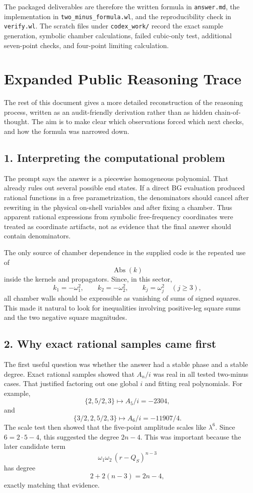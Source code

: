 \documentclass[11pt]{article}
\begin{document}
The packaged deliverables are therefore the written formula in
\texttt{answer.md}, the implementation in \texttt{two\_minus\_formula.wl}, and
the reproducibility check in \texttt{verify.wl}. The scratch files under
\texttt{codex\_work/} record the exact sample generation, symbolic chamber
calculations, failed cubic-only test, additional seven-point checks, and
four-point limiting calculation.

\section*{Expanded Public Reasoning Trace}

The rest of this document gives a more detailed reconstruction of the reasoning
process, written as an audit-friendly derivation rather than as hidden
chain-of-thought. The aim is to make clear which observations forced which
next checks, and how the formula was narrowed down.

\subsection*{1. Interpreting the computational problem}

The prompt says the answer is a piecewise homogeneous polynomial. That already
rules out several possible end states. If a direct BG evaluation produced
rational functions in a free parametrization, the denominators should cancel
after rewriting in the physical on-shell variables and after fixing a chamber.
Thus apparent rational expressions from symbolic free-frequency coordinates
were treated as coordinate artifacts, not as evidence that the final answer
should contain denominators.

The only source of chamber dependence in the supplied code is the repeated use
of
\[
    \operatorname{Abs}(k)
\]
inside the kernels and propagators. Since, in this sector,
\[
    k_1=-\omega_1^2,\qquad
    k_2=-\omega_2^2,\qquad
    k_j=\omega_j^2\quad(j\geq 3),
\]
all chamber walls should be expressible as vanishing of sums of signed squares.
This made it natural to look for inequalities involving positive-leg square
sums and the two negative square magnitudes.

\subsection*{2. Why exact rational samples came first}

The first useful question was whether the answer had a stable phase and a
stable degree. Exact rational samples showed that \(A_n/i\) was real in all
tested two-minus cases. That justified factoring out one global \(i\) and
fitting real polynomials. For example,
\[
    \{2,5/2,3\}\mapsto A_5/i=-2304,
\]
and
\[
    \{3/2,2,5/2,3\}\mapsto A_6/i=-11907/4.
\]
The scale test then showed that the five-point amplitude scales like
\(\lambda^6\). Since \(6=2\cdot5-4\), this suggested the degree \(2n-4\).
This was important because the later candidate term
\[
    \omega_1\omega_2\,(r-Q_S)^{n-3}
\]
has degree
\[
    2+2(n-3)=2n-4,
\]
exactly matching that evidence.
\end{document}
